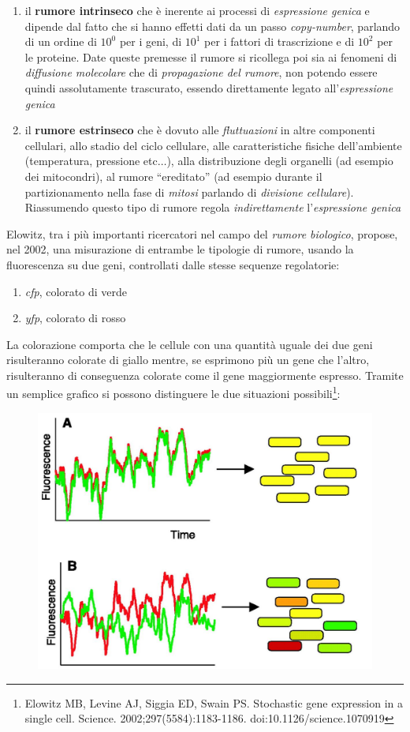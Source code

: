 \documentclass[a4paper,12pt, oneside]{book}
\begin{document}
\begin{enumerate}
  \item il \textbf{rumore intrinseco} che è inerente ai processi di\textit{
    espressione genica} e dipende dal fatto che si hanno effetti dati da un
  passo \textit{copy-number}, parlando di un ordine di $10^0$ per i geni, di
  $10^1$ per i fattori di trascrizione e di $10^2$ per le proteine. Date queste
  premesse il rumore si ricollega poi sia ai fenomeni di \textit{diffusione
    molecolare} che di \textit{propagazione del rumore}, non potendo essere
  quindi assolutamente trascurato, essendo direttamente legato
  all'\textit{espressione genica}  
  \item il \textbf{rumore estrinseco} che è dovuto alle \textit{fluttuazioni}
  in altre componenti cellulari, allo stadio del ciclo cellulare, alle
  caratteristiche fisiche dell'ambiente (temperatura, pressione etc$\ldots$),
  alla distribuzione degli organelli (ad esempio dei mitocondri), al rumore
  ``ereditato'' (ad esempio durante il partizionamento nella fase di
  \textit{mitosi} parlando di \textit{divisione cellulare}). Riassumendo questo
  tipo di rumore regola \textit{indirettamente} l'\textit{espressione genica}
\end{enumerate}
Elowitz, tra i più importanti ricercatori nel campo del \textit{rumore
  biologico}, propose, nel 2002, una misurazione di entrambe le tipologie di
rumore, usando la fluorescenza su due geni, controllati dalle stesse sequenze
regolatorie: 
\begin{enumerate}
  \item \textit{cfp}, colorato di verde
  \item \textit{yfp}, colorato di rosso
\end{enumerate}
La colorazione comporta che le cellule con una quantità uguale dei due geni
risulteranno colorate di giallo mentre, se esprimono più un gene che l'altro,
risulteranno di conseguenza colorate come il gene maggiormente espresso. Tramite
un semplice grafico si possono distinguere le due situazioni
possibili\footnote{Elowitz MB, Levine AJ, Siggia ED, Swain PS. Stochastic gene
  expression in a single
  cell. Science. 2002;297(5584):1183-1186. doi:10.1126/science.1070919}:
\begin{figure}[H]
  \centering
  \includegraphics[scale = 0.25]{img/noise.jpg}
\end{figure}
\end{document}
